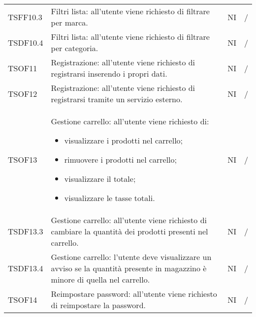 \begin{center}
\begin{longtable}[!h]{p{60px} p{240px} p{35px} p{35px}}
        TSFF10.3                         & Filtri lista: all'utente viene richiesto di filtrare per marca.                                                                                                     & NI             & /             \\
        TSDF10.4                         & Filtri lista: all'utente viene richiesto di filtrare per categoria.                                                                                                 & NI             & /             \\
        TSOF11                           & Registrazione: all'utente viene richiesto di registrarsi inserendo i propri dati.                                                                                   & NI             & /             \\
        TSOF12                           & Registrazione: all'utente viene richiesto di registrarsi tramite un servizio esterno.                                                                               & NI             & /             \\
        TSOF13                           & Gestione carrello: all'utente viene richiesto di: \begin{itemize} \item visualizzare i prodotti nel carrello; \item rimuovere i prodotti nel carrello; \item visualizzare il totale; \item visualizzare le tasse totali. \end{itemize}                                                                                        & NI             & /             \\
        TSDF13.3                         & Gestione carrello: all'utente viene richiesto di cambiare la quantità dei prodotti presenti nel carrello.                                                           & NI             & /             \\
        TSDF13.4                         & Gestione carrello: l'utente deve visualizzare un avviso se la quantità presente in magazzino è minore di quella nel carrello.                                       & NI             & /             \\
        TSOF14                           & Reimpostare password: all'utente viene richiesto di reimpostare la password.                                                                                        & NI             & /             \\

\end{longtable}
\end{center}
